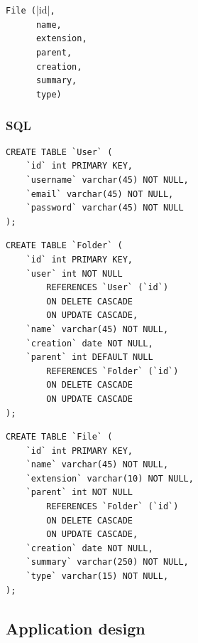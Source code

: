 \documentclass[a4paper, dvipsnames]{article}
\begin{document}
\begin{multicols}{2}
		\verb|File (|\ulverb|id|\verb|,         |  \\
		\verb|      name,       |  \\
		\verb|      extension,  |  \\
		\verb|      parent,     |  \\
		\verb|      creation,   |  \\
		\verb|      summary,    |  \\
		\verb|      type)       | 
		
	\end{multicols}
	
	\subsubsection{SQL}
	
	\begin{multicols}{2}
		\begin{verbatim}
CREATE TABLE `User` (
	`id` int PRIMARY KEY,
	`username` varchar(45) NOT NULL,
	`email` varchar(45) NOT NULL,
	`password` varchar(45) NOT NULL
);
		\end{verbatim}
		\begin{verbatim}
CREATE TABLE `Folder` (
	`id` int PRIMARY KEY,
	`user` int NOT NULL
		REFERENCES `User` (`id`)
		ON DELETE CASCADE
		ON UPDATE CASCADE,
	`name` varchar(45) NOT NULL,
	`creation` date NOT NULL,
	`parent` int DEFAULT NULL
		REFERENCES `Folder` (`id`)
		ON DELETE CASCADE
		ON UPDATE CASCADE
);
		\end{verbatim}
		\begin{verbatim}
CREATE TABLE `File` (
	`id` int PRIMARY KEY,
	`name` varchar(45) NOT NULL,
	`extension` varchar(10) NOT NULL,
	`parent` int NOT NULL
		REFERENCES `Folder` (`id`)
		ON DELETE CASCADE
		ON UPDATE CASCADE,
	`creation` date NOT NULL,
	`summary` varchar(250) NOT NULL,
	`type` varchar(15) NOT NULL,
);
		\end{verbatim}
	\end{multicols}

	\pagebreak
	
	\subsection{Application design}
	
\end{document}
